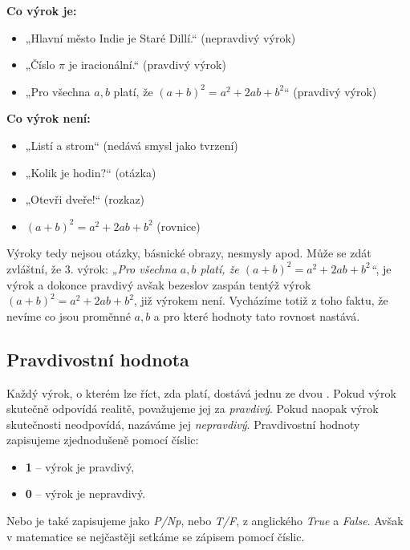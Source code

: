 \documentclass[12pt,a4paper]{article}
\begin{document}
\begin{examplebox}
\textbf{Co výrok je:}
\begin{itemize}
    \item „Hlavní město Indie je Staré Dillí.“                          \hfill (nepravdivý výrok)
    \item „Číslo $\pi$ je iracionální.“                                 \hfill (pravdivý výrok)
    \item „Pro všechna $a,b$ platí, že $(a + b)^2 = a^2 + 2ab + b^2 $“   \hfill (pravdivý výrok)
\end{itemize}

\textbf{Co výrok není:}
\begin{itemize}
    \item „Listí a strom“                           \hfill (nedává smysl jako tvrzení)
    \item „Kolik je hodin?“                         \hfill (otázka)
    \item „Otevři dveře!“                           \hfill (rozkaz)
    \item $(a + b)^2 = a^2 + 2ab + b^2$             \hfill (rovnice)
\end{itemize}
\end{examplebox}
Výroky tedy nejsou otázky, básnické obrazy, nesmysly apod. Může se zdát zvláštní, že 3. výrok: 
\emph{„Pro všechna $a,b$ platí, že $(a + b)^2 = a^2 + 2ab + b^2 $“}, je výrok a dokonce pravdivý avšak
bezeslov zaspán tentýž výrok $(a + b)^2 = a^2 + 2ab + b^2$, již výrokem není. 
Vycházíme totiž z toho faktu, že nevíme co jsou proměnné $a, b$ a pro které hodnoty tato rovnost nastává.  

\newpage
\subsection{Pravdivostní hodnota}

Každý výrok, o kterém lze říct, zda platí, dostává jednu ze dvou .  
Pokud výrok skutečně odpovídá realitě, považujeme jej za \emph{pravdivý}.  
Pokud naopak výrok skutečnosti neodpovídá, nazáváme jej \emph{nepravdivý}. 
Pravdivostní hodnoty zapisujeme zjednodušeně pomocí číslic:
\begin{itemize}
    \item \textbf{1} – výrok je pravdivý,  
    \item \textbf{0} – výrok je nepravdivý.
\end{itemize}
Nebo je také zapisujeme jako \emph{P/Np}, nebo \emph{T/F}, z anglického \emph{True} a \emph{False}.
Avšak v matematice se nejčastěji setkáme se zápisem pomocí číslic.
\end{document}
